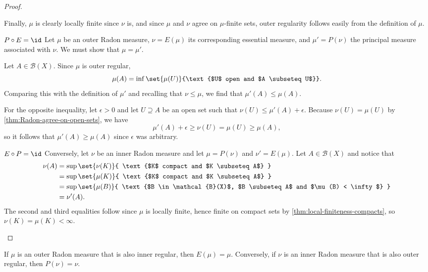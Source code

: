 \documentclass[article, a4paper, 11pt, oneside]{memoir}
\numberwithin{equation}{chapter}
\newcommand{\calB}{\mathcal{B}}
\newcommand{\borel}[1]{\calB(#1)}
\begin{document}
\begin{proof}
\begin{proofsec}
    Finally, $\mu$ is clearly locally finite since $\nu$ is, and since $\mu$ and $\nu$ agree on $\mu$-finite sets, outer regularity follows easily from the definition of $\mu$.

    \item[$P \circ E = \id$]
    Let $\mu$ be an outer Radon measure, $\nu = E(\mu)$ its corresponding essential measure, and $\mu' = P(\nu)$ the principal measure associated with $\nu$. We must show that $\mu = \mu'$.

    Let $A \in \borel{X}$. Since $\mu$ is outer regular,
    \begin{equation*}
        \mu(A)
            = \inf \set{\mu(U)}{\text{$U$ open and $A \subseteq U$}}.
    \end{equation*}
    Comparing this with the definition of $\mu'$ and recalling that $\nu \leq \mu$, we find that $\mu'(A) \leq \mu(A)$.

    For the opposite inequality, let $\epsilon > 0$ and let $U \supseteq A$ be an open set such that $\nu(U) \leq \mu'(A) + \epsilon$. Because $\nu(U) = \mu(U)$ by \cref{thm:Radon-agree-on-open-sets}, we have
    \begin{equation*}
        \mu'(A) + \epsilon
            \geq \nu(U)
            = \mu(U)
            \geq \mu(A),
    \end{equation*}
    so it follows that $\mu'(A) \geq \mu(A)$ since $\epsilon$ was arbitrary.

    \item[$E \circ P = \id$]
    Conversely, let $\nu$ be an inner Radon measure and let $\mu = P(\nu)$ and $\nu' = E(\mu)$. Let $A \in \borel{X}$ and notice that
    \begin{align*}
        \nu(A)
            &= \sup \set{\nu(K)}{ \text{$K$ compact and $K \subseteq A$} } \\
            &= \sup \set{\mu(K)}{ \text{$K$ compact and $K \subseteq A$} } \\
            &= \sup \set{\mu(B)}{ \text{$B \in \borel{X}$, $B \subseteq A$ and $\mu(B) < \infty$} } \\
            &= \nu'(A).
    \end{align*}
    The second and third equalities follow since $\mu$ is locally finite, hence finite on compact sets by \cref{thm:local-finiteness-compacts}, so $\nu(K) = \mu(K) < \infty$.
\end{proofsec}
\end{proof}


\begin{proposition}
    If $\mu$ is an outer Radon measure that is also inner regular, then $E(\mu) = \mu$. Conversely, if $\nu$ is an inner Radon measure that is also outer regular, then $P(\nu) = \nu$.
\end{proposition}
\end{document}
